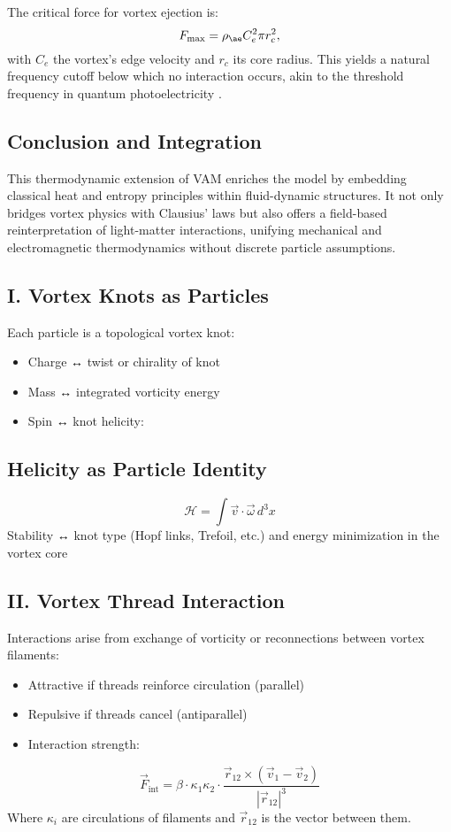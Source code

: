 The critical force for vortex ejection is:
\begin{equation}
F_{\text{max}} = \rho_{\ae} C_e^2 \pi r_c^2,
\end{equation}
with $C_e$ the vortex's edge velocity and $r_c$ its core radius. This yields a natural frequency cutoff below which no interaction occurs, akin to the threshold frequency in quantum photoelectricity \cite{einstein1905photoelectric}.

\subsection{Conclusion and Integration}

This thermodynamic extension of VAM enriches the model by embedding classical heat and entropy principles within fluid-dynamic structures. It not only bridges vortex physics with Clausius' laws but also offers a field-based reinterpretation of light-matter interactions, unifying mechanical and electromagnetic thermodynamics without discrete particle assumptions.






\subsection*{I. Vortex Knots as Particles}
Each particle is a topological vortex knot:
\begin{itemize}
    \item Charge ↔ twist or chirality of knot
    \item Mass ↔ integrated vorticity energy
    \item Spin ↔ knot helicity:
\end{itemize}
\subsection*{Helicity as Particle Identity}
\begin{equation}
    \mathcal{H} = \int \vec{v} \cdot \vec{\omega} \, d^3x
\end{equation}
Stability ↔ knot type (Hopf links, Trefoil, etc.) and energy minimization in the vortex core

\subsection*{II. Vortex Thread Interaction}
Interactions arise from exchange of vorticity or reconnections between vortex filaments:
\begin{itemize}
    \item Attractive if threads reinforce circulation (parallel)
    \item Repulsive if threads cancel (antiparallel)
    \item Interaction strength:
\end{itemize}
\begin{equation}
    \vec{F}_{\text{int}} = \beta \cdot \kappa_1 \kappa_2 \cdot \frac{\vec{r}_{12} \times (\vec{v}_1 - \vec{v}_2)}{|\vec{r}_{12}|^3}
\end{equation}
Where \(\kappa_i\) are circulations of filaments and \(\vec{r}_{12}\) is the vector between them.


